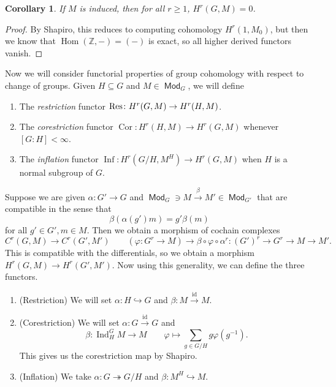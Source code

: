 \documentclass[leqno, openany]{memoir}
\newtheorem{cor}[thm]{Corollary}
\theoremstyle{definition}
\theoremstyle{remark}
\theoremstyle{plain}
\theoremstyle{definition}
\theoremstyle{remark}
\newcommand{\Z}{\mathbb{Z}}
\newcommand{\mr}[1]{\mathrm{#1}}
\DeclareMathOperator{\Hom}{Hom}
\DeclareMathOperator{\Mod}{\mathsf{Mod}}
\DeclareMathOperator{\Ind}{Ind}
\DeclareMathOperator{\Inf}{Inf}
\DeclareMathOperator{\Cor}{Cor}
\begin{document}
\begin{cor} If $M$ is induced, then for all $r \geq 1$, $H^r(G, M) = 0$.
\end{cor}

\begin{proof} By Shapiro, this reduces to computing cohomology $H^r(1, M_0)$,
but then we know that $\Hom(\Z, -) = (-)$ is exact, so all higher derived
functors vanish.  \end{proof}

Now we will consider functorial properties of group cohomology with respect to
change of groups. Given $H \subseteq G$ and $M \in \Mod_G$, we will define
\begin{enumerate} \item The \textit{restriction} functor $\Res \colon H^r(G, M)
    \to H^r(H, M)$.  \item The \textit{corestriction} functor $\Cor \colon
    H^r(H, M) \to H^r(G, M)$ whenever $[G:H] < \infty$.  \item The
    \textit{inflation} functor $\Inf \colon H^r(G/H, M^H) \to H^r(G, M)$ when
    $H$ is a normal subgroup of $G$.  \end{enumerate}

Suppose we are given $\alpha \colon G' \to G$ and $\Mod_G \ni M
\xrightarrow{\beta} M' \in \Mod_{G'}$ that are compatible in the sense that \[
\beta(\alpha(g')m) = g' \beta (m) \] for all $g' \in G', m \in M$. Then we
obtain a morphism of cochain complexes \[ C^r(G, M) \to C^r(G', M') \qquad
(\varphi \colon G^r \to M) \to \beta \circ \varphi \circ \alpha^r \colon
{(G')}^r \to G^r \to M \to M'. \] This is compatible with the differentials, so
we obtain a morphism $H^r(G, M) \to H^r(G', M')$. Now using this generality, we
can define the three functors.

\begin{enumerate} \item (Restriction) We will set $\alpha \colon H
    \hookrightarrow G$ and $\beta \colon M \xrightarrow{\mr{id}} M$.  \item
    (Corestriction) We will set $\alpha \colon G \xrightarrow{\mr{id}} G$ and
    \[ \beta \colon \Ind_H^G M \to M \qquad \varphi \mapsto \sum_{g \in G/H} g
    \varphi(g^{-1}). \] This gives us the corestriction map by Shapiro.  \item
    (Inflation) We take $\alpha \colon G \twoheadrightarrow G/H$ and $\beta
    \colon M^H \hookrightarrow M$.  \end{enumerate}
\end{document}
